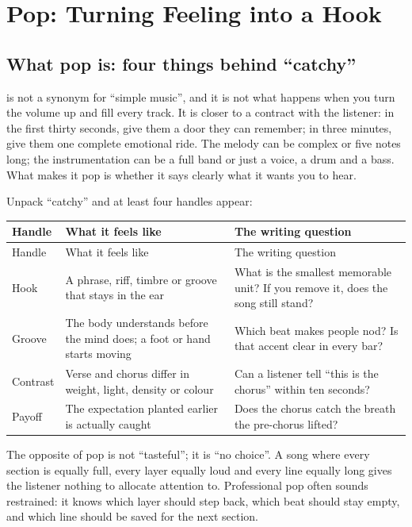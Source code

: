 \chapter{Pop: Turning Feeling into a Hook}
\label{ch:genre-pop-deep}


\section{What pop is: four things behind ``catchy''}
\label{sec:pop-what}

 is not a synonym for ``simple music'', and it is not what happens when you turn the volume up and fill every track. It is closer to a contract with the listener: in the first thirty seconds, give them a door they can remember; in three minutes, give them one complete emotional ride. The melody can be complex or five notes long; the instrumentation can be a full band or just a voice, a drum and a bass. What makes it pop is whether it says clearly what it wants you to hear.

Unpack ``catchy'' and at least four handles appear:

\begin{longtable}{p{}p{}p{}}
\toprule
Handle & What it feels like & The writing question \\
\midrule
\endfirsthead
\toprule
Handle & What it feels like & The writing question \\
\midrule
\endhead
Hook & A phrase, riff, timbre or groove that stays in the ear & What is the smallest memorable unit? If you remove it, does the song still stand? \\
Groove & The body understands before the mind does; a foot or hand starts moving & Which beat makes people nod? Is that accent clear in every bar? \\
Contrast & Verse and chorus differ in weight, light, density or colour & Can a listener tell ``this is the chorus'' within ten seconds? \\
Payoff & The expectation planted earlier is actually caught & Does the chorus catch the breath the pre-chorus lifted? \\
\bottomrule
\end{longtable}

The opposite of pop is not ``tasteful''; it is ``no choice''. A song where every section is equally full, every layer equally loud and every line equally long gives the listener nothing to allocate attention to. Professional pop often sounds restrained: it knows which layer should step back, which beat should stay empty, and which line should be saved for the next section.

